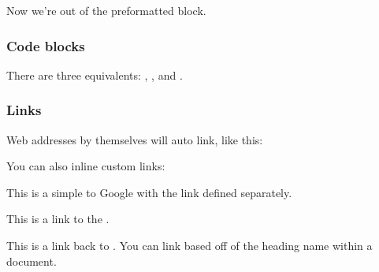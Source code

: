 \documentclass[letterpaper,10pt,english]{sphinxmanual}
\begin{document}
\begin{sphinxVerbatim}[commandchars=\\\{\}]
          
    
   
\end{sphinxVerbatim}

Now we’re out of the preformatted block.


\subsubsection{Code blocks}
\label{\detokenize{sample:code-blocks}}
There are three equivalents: , , and .

\begin{sphinxVerbatim}[commandchars=\\\{\}]
 
\end{sphinxVerbatim}

\begin{sphinxVerbatim}[commandchars=\\\{\}]
\end{sphinxVerbatim}

\begin{sphinxVerbatim}[commandchars=\\\{\}]
\end{sphinxVerbatim}


\subsubsection{Links}
\label{\detokenize{sample:links}}
Web addresses by themselves will auto link, like this: 

You can also inline custom links: 

This is a simple  to Google with the link defined separately.

This is a link to the .

This is a link back to {\hyperref[\detokenize{sample:section-1}]{}}. You can link based off of the heading name
within a document.
\end{document}
